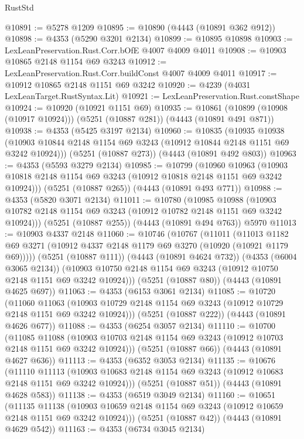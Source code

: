 \begin{lexlean}{RustStd}
\begin{coremodule}
@10891 := @5278 @1209
@10895 := @10890 (@4443 (@10891 @362 @912))
@10898 := @4353 (@5290 @3201 @2134)
@10899 := @10895 @10898
@10903 := LexLeanPreservation.Rust.Corr.bOfE @4007 @4009 @4011
@10908 := @10903 @10865 @2148 @1154 @69 @3243
@10912 := LexLeanPreservation.Rust.Corr.buildConst @4007 @4009 @4011
@10917 := @10912 @10865 @2148 @1151 @69 @3242
@10920 := @4239 (@4031 LexLeanTarget.RustSyntax.Lit)
@10921 := LexLeanPreservation.Rust.constShape
@10924 := @10920 (@10921 @1151 @69)
@10935 := @10861 (@10899 (@10908 (@10917 @10924))) (@5251 (@10887 @281)) (@4443 (@10891 @491 @871))
@10938 := @4353 (@5425 @3197 @2134)
@10960 := @10835
    (@10935
      @10938
      (@10903 @10844 @2148 @1154 @69 @3243 (@10912 @10844 @2148 @1151 @69 @3242 @10924)))
    (@5251 (@10887 @273))
    (@4443 (@10891 @492 @803))
@10963 := @4353 (@5593 @3279 @2134)
@10985 := @10799
    (@10960
      @10963
      (@10903 @10818 @2148 @1154 @69 @3243 (@10912 @10818 @2148 @1151 @69 @3242 @10924)))
    (@5251 (@10887 @265))
    (@4443 (@10891 @493 @771))
@10988 := @4353 (@5820 @3071 @2134)
@11011 := @10780
    (@10985
      @10988
      (@10903 @10782 @2148 @1154 @69 @3243 (@10912 @10782 @2148 @1151 @69 @3242 @10924)))
    (@5251 (@10887 @255))
    (@4443 (@10891 @494 @763))
    @5970
@11013 := @10903 @4337 @2148
@11060 := @10746
    (@10767
      (@11011
        (@11013 @1182 @69 @3271 (@10912 @4337 @2148 @1179 @69 @3270 (@10920 (@10921 @1179 @69)))))
      (@5251 (@10887 @111))
      (@4443 (@10891 @4624 @732))
      (@4353 (@6004 @3065 @2134))
      (@10903 @10750 @2148 @1154 @69 @3243 (@10912 @10750 @2148 @1151 @69 @3242 @10924)))
    (@5251 (@10887 @80))
    (@4443 (@10891 @4625 @697))
@11063 := @4353 (@6153 @3061 @2134)
@11085 := @10720
    (@11060
      @11063
      (@10903 @10729 @2148 @1154 @69 @3243 (@10912 @10729 @2148 @1151 @69 @3242 @10924)))
    (@5251 (@10887 @222))
    (@4443 (@10891 @4626 @677))
@11088 := @4353 (@6254 @3057 @2134)
@11110 := @10700
    (@11085
      @11088
      (@10903 @10703 @2148 @1154 @69 @3243 (@10912 @10703 @2148 @1151 @69 @3242 @10924)))
    (@5251 (@10887 @66))
    (@4443 (@10891 @4627 @636))
@11113 := @4353 (@6352 @3053 @2134)
@11135 := @10676
    (@11110
      @11113
      (@10903 @10683 @2148 @1154 @69 @3243 (@10912 @10683 @2148 @1151 @69 @3242 @10924)))
    (@5251 (@10887 @51))
    (@4443 (@10891 @4628 @583))
@11138 := @4353 (@6519 @3049 @2134)
@11160 := @10651
    (@11135
      @11138
      (@10903 @10659 @2148 @1154 @69 @3243 (@10912 @10659 @2148 @1151 @69 @3242 @10924)))
    (@5251 (@10887 @42))
    (@4443 (@10891 @4629 @542))
@11163 := @4353 (@6734 @3045 @2134)

\end{coremodule}
\end{lexlean}
